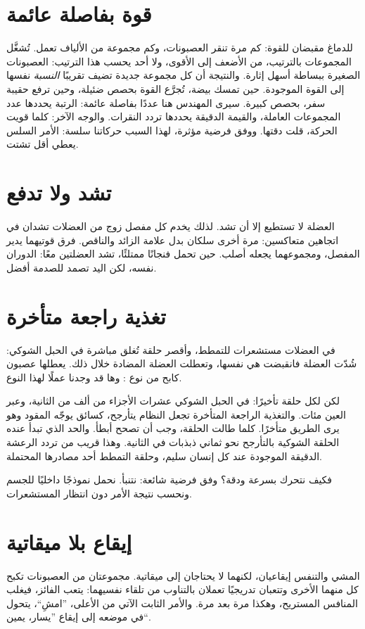 \section*{قوة بفاصلة عائمة}

للدماغ مقبضان للقوة: كم مرة تنقر العصبونات، وكم مجموعة من الألياف تعمل. تُشغَّل المجموعات بالترتيب، من الأضعف إلى الأقوى، ولا أحد يحسب هذا الترتيب: العصبونات الصغيرة ببساطة أسهل إثارة. والنتيجة أن كل مجموعة جديدة تضيف تقريبًا \emph{النسبة} نفسها إلى القوة الموجودة. حين تمسك بيضة، تُجرَّع القوة بحصص ضئيلة، وحين ترفع حقيبة سفر، بحصص كبيرة. سيرى المهندس هنا عددًا بفاصلة عائمة: الرتبة يحددها عدد المجموعات العاملة، والقيمة الدقيقة يحددها تردد النقرات. والوجه الآخر: كلما قويت الحركة، قلت دقتها. ووفق فرضية مؤثرة، لهذا السبب حركاتنا سلسة: الأمر السلس يعطي أقل تشتت.

\section*{تشد ولا تدفع}

العضلة لا تستطيع إلا أن تشد. لذلك يخدم كل مفصل زوج من العضلات تشدان في اتجاهين متعاكسين: مرة أخرى سلكان بدل علامة الزائد والناقص. فرق قوتيهما يدير المفصل، ومجموعهما يجعله أصلب. حين تحمل فنجانًا ممتلئًا، تشد العضلتين معًا: الدوران نفسه، لكن اليد تصمد للصدمة أفضل.


\section*{تغذية راجعة متأخرة}

في العضلات مستشعرات للتمطط، وأقصر حلقة تُغلق مباشرة في الحبل الشوكي: شُدّت العضلة فانقبضت هي نفسها، وتعطلت العضلة المضادة خلال ذلك. يعطلها عصبون كابح من نوع : وها قد وجدنا عملًا لهذا النوع.

لكن لكل حلقة تأخيرًا: في الحبل الشوكي عشرات الأجزاء من ألف من الثانية، وعبر العين مئات. والتغذية الراجعة المتأخرة تجعل النظام يتأرجح، كسائق يوجّه المقود وهو يرى الطريق متأخرًا. كلما طالت الحلقة، وجب أن تصحح أبطأ. والحد الذي تبدأ عنده الحلقة الشوكية بالتأرجح نحو ثماني ذبذبات في الثانية. وهذا قريب من تردد الرعشة الدقيقة الموجودة عند كل إنسان سليم، وحلقة التمطط أحد مصادرها المحتملة.

فكيف نتحرك بسرعة ودقة؟ وفق فرضية شائعة: نتنبأ. نحمل نموذجًا داخليًا للجسم ونحسب نتيجة الأمر دون انتظار المستشعرات.

\section*{إيقاع بلا ميقاتية}

المشي والتنفس إيقاعيان، لكنهما لا يحتاجان إلى ميقاتية. مجموعتان من العصبونات تكبح كل منهما الأخرى وتتعبان تدريجيًا تعملان بالتناوب من تلقاء نفسيهما: يتعب الفائز، فيغلب المنافس المستريح، وهكذا مرة بعد مرة. والأمر الثابت الآتي من الأعلى، ”امشِ“، يتحول في موضعه إلى إيقاع ”يسار، يمين“.

